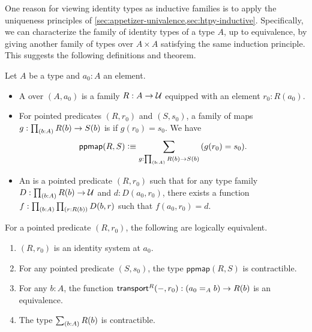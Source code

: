 
\mentalpause

One reason for viewing identity types as inductive families is to apply the uniqueness principles of \autoref{sec:appetizer-univalence,sec:htpy-inductive}.
Specifically, we can characterize the family of identity types of a type $A$, up to equivalence, by giving another family of types over $A\times A$ satisfying the same induction principle.
This suggests the following definitions and theorem.

%
%

\begin{defn}\label{defn:identity-systems}
  Let $A$ be a type and $a_0:A$ an element.
  \begin{itemize}
  \item A 
    over $(A,a_0)$ is a family $R:A\to\mathcal{U}$ equipped with an element $r_0:R(a_0)$.
  \item For pointed predicates $(R,r_0)$ and $(S,s_0)$, a family of maps $g:\prd{b:A} R(b) \to S(b)$ is  if $g(r_0)=s_0$.
    We have
    \[ \mathsf{ppmap}(R,S) \defeq \sm{g:\prd{b:A} R(b) \to S(b)} (g(r_0)=s_0).\]
  \item An 
    is a pointed predicate $(R,r_0)$ such that for any type family $D:\prd{b:A} R(b) \to \type$ and $d:D(a_0,r_0)$, there exists a function $f:\prd{b:A}{r:R(b)} D(b,r)$ such that $f(a_0,r_0)=d$.
\end{itemize}
\end{defn}

\begin{thm}\label{thm:identity-systems}
  For a pointed predicate $(R,r_0)$, the following are logically equivalent.
  \begin{enumerate}
  \item $(R,r_0)$ is an identity system at $a_0$.\label{item:identity-systems1}
  \item For any pointed predicate $(S,s_0)$, the type $\mathsf{ppmap}(R,S)$ is contractible.\label{item:identity-systems2}
  \item For any $b:A$, the function $\mathsf{transport}^{R}(-,r_0) : (a_0 =_A b) \to R(b)$ is an equivalence.\label{item:identity-systems3}
  \item The type $\sm{b:A} R(b)$ is contractible.\label{item:identity-systems4}
  \end{enumerate}
\end{thm}

